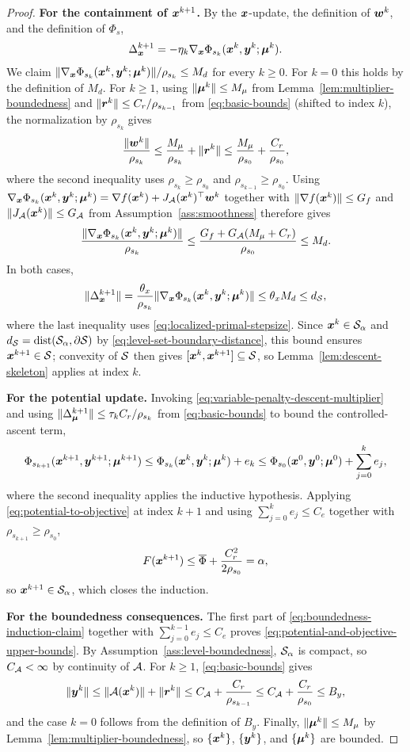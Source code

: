 \begin{proof}
\textbf{For the containment of $\bm{x}^{k+1}$.}
By the $\bm{x}$-update, the definition of $\bm{w}^k$, and the definition of $\Phi_s$,
\[
    \Delta_{\bm{x}}^{k+1}
    =
    -\eta_k \nabla_{\bm{x}}\Phi_{s_k}(\bm{x}^k,\bm{y}^k;\bm{\mu}^k).
\]
We claim $\|\nabla_{\bm{x}}\Phi_{s_k}(\bm{x}^k,\bm{y}^k;\bm{\mu}^k)\|/\rho_{s_k}\le M_d$ for every $k\ge0$.  For $k=0$ this
holds by the definition of $M_d$.  For $k\ge1$, using
$\|\bm{\mu}^k\|\le M_\mu$ from
Lemma~\ref{lem:multiplier-boundedness} and
$\|\bm{r}^k\|\le C_r/\rho_{s_{k-1}}$ from \eqref{eq:basic-bounds} (shifted
to index $k$), the normalization by $\rho_{s_k}$ gives
\[
    \frac{\|\bm{w}^k\|}{\rho_{s_k}}
    \le\frac{M_\mu}{\rho_{s_k}}+\|\bm{r}^k\|
    \le\frac{M_\mu}{\rho_{s_0}}+\frac{C_r}{\rho_{s_0}},
\]
where the second inequality uses $\rho_{s_k}\ge\rho_{s_0}$ and
$\rho_{s_{k-1}}\ge\rho_{s_0}$.  Using
$\nabla_{\bm{x}}\Phi_{s_k}(\bm{x}^k,\bm{y}^k;\bm{\mu}^k)
=\nabla f(\bm{x}^k)+J_{\mathcal{A}}(\bm{x}^k)^\top\bm{w}^k$
together with $\|\nabla f(\bm{x}^k)\|\le G_f$ and
$\|J_{\mathcal{A}}(\bm{x}^k)\|\le G_{\mathcal{A}}$ from
Assumption~\ref{ass:smoothness} therefore gives
\[
    \frac{\|\nabla_{\bm{x}}\Phi_{s_k}(\bm{x}^k,\bm{y}^k;\bm{\mu}^k)\|}{\rho_{s_k}}
    \le\frac{G_f+G_{\mathcal{A}}(M_\mu+C_r)}{\rho_{s_0}}
    \le M_d.
\]
In both cases,
\[
    \|\Delta_{\bm{x}}^{k+1}\|
    =\frac{\theta_x}{\rho_{s_k}}\|\nabla_{\bm{x}}\Phi_{s_k}(\bm{x}^k,\bm{y}^k;\bm{\mu}^k)\|
    \le\theta_x M_d
    \le d_{\mathcal{S}},
\]
where the last inequality uses \eqref{eq:localized-primal-stepsize}.
Since
$\bm{x}^k\in\mathcal{S}_\alpha$ and
$d_{\mathcal{S}}=\operatorname{dist}(\mathcal{S}_\alpha,\partial\mathcal{S})$
by \eqref{eq:level-set-boundary-distance}, this bound ensures
$\bm{x}^{k+1}\in\mathcal{S}$; convexity of $\mathcal{S}$ then gives
$[\bm{x}^k,\bm{x}^{k+1}]\subseteq\mathcal{S}$, so
Lemma~\ref{lem:descent-skeleton} applies at index $k$.

\textbf{For the potential update.}
Invoking \eqref{eq:variable-penalty-descent-multiplier} and using
$\|\Delta_{\bm{\mu}}^{k+1}\|\le\tau_k C_r/\rho_{s_k}$ from
\eqref{eq:basic-bounds} to bound the controlled-ascent term,
\[
    \Phi_{s_{k+1}}(\bm{x}^{k+1},\bm{y}^{k+1};\bm{\mu}^{k+1})
    \le \Phi_{s_k}(\bm{x}^k,\bm{y}^k;\bm{\mu}^k)+e_k
    \le \Phi_{s_0}(\bm{x}^0,\bm{y}^0;\bm{\mu}^0)
       +\sum_{j=0}^{k}e_j,
\]
where the second inequality applies the inductive hypothesis.
Applying \eqref{eq:potential-to-objective} at index $k+1$ and using
$\sum_{j=0}^{k}e_j\le C_e$ together with $\rho_{s_{k+1}}\ge\rho_{s_0}$,
\[
    F(\bm{x}^{k+1})
    \le\overline\Phi+\frac{C_r^2}{2\rho_{s_0}}
    =\alpha,
\]
so $\bm{x}^{k+1}\in\mathcal{S}_\alpha$, which closes the induction.

\textbf{For the boundedness consequences.}
The first part of \eqref{eq:boundedness-induction-claim} together with
$\sum_{j=0}^{k-1}e_j\le C_e$ proves
\eqref{eq:potential-and-objective-upper-bounds}.  By
Assumption~\ref{ass:level-boundedness}, $\mathcal{S}_\alpha$ is compact, so
$C_{\mathcal{A}}<\infty$ by continuity of $\mathcal{A}$.  For $k\ge1$,
\eqref{eq:basic-bounds} gives
\[
    \|\bm{y}^k\|
    \le\|\mathcal{A}(\bm{x}^k)\|+\|\bm{r}^k\|
    \le C_{\mathcal{A}}+\frac{C_r}{\rho_{s_{k-1}}}
    \le C_{\mathcal{A}}+\frac{C_r}{\rho_{s_0}}
    \le B_y,
\]
and the case $k=0$ follows from the definition of $B_y$.  Finally,
$\|\bm{\mu}^k\|\le M_\mu$ by Lemma~\ref{lem:multiplier-boundedness},
so $\{\bm{x}^k\}$, $\{\bm{y}^k\}$, and $\{\bm{\mu}^k\}$ are bounded.
\end{proof}

